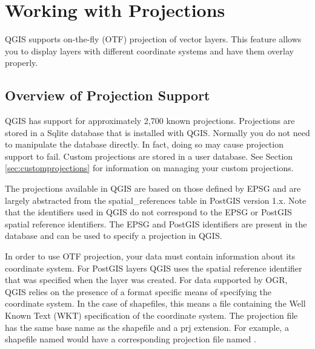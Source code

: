 
\section{Working with Projections}\label{label_projections}

QGIS supports on-the-fly (OTF) projection of vector layers. This feature allows you
to display layers with different coordinate systems and have them overlay
properly.

\subsection{Overview of Projection Support}\label{label_projoverview}

QGIS has support for approximately 2,700 known projections. 
Projections are stored in a Sqlite database that is installed with QGIS.
Normally you do not need to manipulate the database directly. In fact,
doing so may cause projection support to fail. Custom projections are
stored in a user database. See Section \ref{sec:customprojections} for
information on managing your custom projections.

The projections available in QGIS are based on those defined by
EPSG and are
largely abstracted from the spatial\_references table in
PostGIS version 1.x.
Note that the identifiers used in QGIS do not correspond to the EPSG or
PostGIS spatial reference identifiers. The EPSG and PostGIS identifiers are
present in the database and can be used to specify a projection in QGIS.

In order to use OTF projection, your data must contain information about its
coordinate system. For PostGIS layers QGIS uses the spatial reference
identifier that was specified when the layer was created. For data supported
by OGR, QGIS relies on the presence of a format specific means of specifying
the coordinate system. In the case of shapefiles, this means a file containing
the Well Known Text (WKT) specification of the coordinate
system. The
projection file has the same base name as the shapefile and a prj extension.
For example, a shapefile named  would have a corresponding projection
file named .


